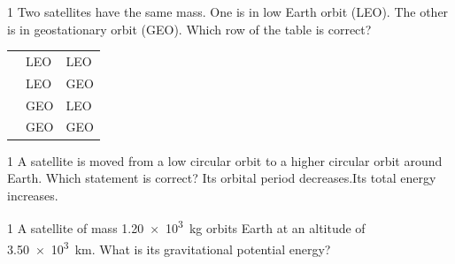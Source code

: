 \begin{practiceq}{1}{}
Two satellites have the same mass. One is in low Earth orbit (LEO). The other is in geostationary
orbit (GEO). Which row of the table is correct?
\begin{center}
  \renewcommand\arraystretch{1.45}
  \begin{tabular}{@{}C{10mm}C{60mm}C{40mm}@{}}
    \toprule
    &  & \\
    \midrule
     & LEO & LEO\\
     & LEO & GEO\\
     & GEO & LEO\\
     & GEO & GEO\\
    \bottomrule
  \end{tabular}
\end{center}
\end{practiceq}

\begin{practiceq}{1}{}
A satellite is moved from a low circular orbit to a higher circular orbit around Earth. Which
statement is correct?
  {Its orbital period decreases.}{Its total energy increases.}
\end{practiceq}

\begin{practiceq}{1}{}
A satellite of mass \qty{1.20e3}{kg} orbits Earth at an altitude of \qty{3.50e3}{km}. What is its
gravitational potential energy?
\end{practiceq}

